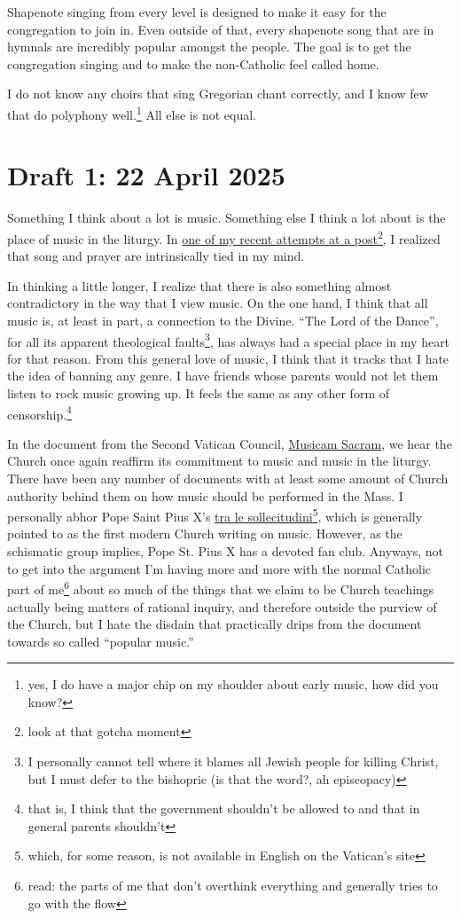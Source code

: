 \documentclass[12pt]{article}
\newcommand{\say}[1]{``#1''}
\renewcommand{\,}{\textsuperscript{,}}
\begin{document}
Shapenote singing from every level is designed to make it easy for the congregation to join in.  
Even outside of that, every shapenote song that are in hymnals are incredibly popular amongst the people.  
The goal is to get the congregation singing and to make the non-Catholic feel called home.

I do not know any choirs that sing Gregorian chant correctly, and I know few that do polyphony well.\footnote{yes, I do have a major chip on my shoulder about early music, how did you know?}  
All else is not equal.

\section{Draft 1: 22 April 2025}

Something I think about a lot is music.  
Something else I think a lot about is the place of music in the liturgy.  
In \href{what-we-dont-write}{one of my recent attempts at a post}\footnote{look at that gotcha moment}, I realized that song and prayer are intrinsically tied in my mind.

In thinking a little longer, I realize that there is also something almost contradictory in the way that I view music.  
On the one hand, I think that all music is, at least in part, a connection to the Divine.  
\say{The Lord of the Dance}, for all its apparent theological faults\footnote{I personally cannot tell where it blames all Jewish people for killing Christ, but I must defer to the bishopric (is that the word?, ah episcopacy)}, has always had a special place in my heart for that reason.  
From this general love of music, I think that it tracks that I hate the idea of banning any genre.  
I have friends whose parents would not let them listen to rock music growing up.  
It feels the same as any other form of censorship.\footnote{that is, I think that the government shouldn't be allowed to and that in general parents shouldn't}

In the document from the Second Vatican Council, \href{https://www.vatican.va/archive/hist\_councils/ii\_vatican\_council/documents/vat-ii\_instr\_19670305\_musicam-sacram\_en.html}{Musicam Sacram}, we hear the Church once again reaffirm its commitment to music and music in the liturgy.  
There have been any number of documents with at least some amount of Church authority behind them on how music should be performed in the Mass.  
I personally abhor Pope Saint Pius X's \href{https://www.papalencyclicals.net/pius10/tra-le-sollecitudini.htm}{tra le sollecitudini}\footnote{which, for some reason, is not available in English on the Vatican's site}, which is generally pointed to as the first modern Church writing on music.  
However, as the schismatic group implies, Pope St. Pius X has a devoted fan club.  
Anyways, not to get into the argument I'm having more and more with the normal Catholic part of me\footnote{read: the parts of me that don't overthink everything and generally tries to go with the flow} about so much of the things that we claim to be Church teachings actually being matters of rational inquiry, and therefore outside the purview of the Church, but I hate the disdain that practically drips from the document towards so called \say{popular music.}
\end{document}
